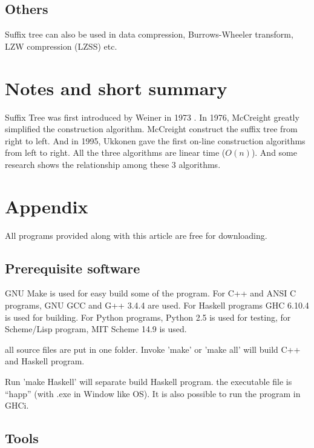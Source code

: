 \documentclass{article}
\begin{document}
\subsection{Others}
Suffix tree can also be used in data compression, Burrows-Wheeler 
transform, LZW compression (LZSS) etc. \cite{wiki-suffix-tree}

\section{Notes and short summary}

Suffix Tree was first introduced by Weiner in 1973 \cite{weiner}.
In 1976, McCreight greatly simplified the construction algorithm.
McCreight construct the suffix tree from right to left. And in 1995,
Ukkonen gave the first on-line construction algorithms from
left to right. All the three algorithms are linear time ($O(n)$).
And some research shows the relationship among these 3 algorithms.
\cite{GieKur97}

\section{Appendix} \label{appendix}
All programs provided along with this article are free for
downloading.

\subsection{Prerequisite software}
GNU Make is used for easy build some of the program. For C++ and ANSI C programs,
GNU GCC and G++ 3.4.4 are used. 
For Haskell programs GHC 6.10.4 is used
for building. For Python programs, Python 2.5 is used for testing, for
Scheme/Lisp program, MIT Scheme 14.9 is used.

all source files are put in one folder. Invoke 'make' or 'make all'
will build C++ and Haskell program. 

Run 'make Haskell' will separate build Haskell program. the executable
file is ``happ'' (with .exe
in Window like OS). It is also possible to run the program in GHCi.

\subsection{Tools}
\end{document}
